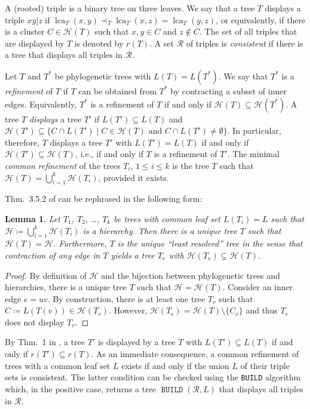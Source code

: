\documentclass[11pt]{article}
\newtheorem{lemma}[theorem]{Lemma}
\newcommand{\lca}{\operatorname{lca}}
\newcommand{\HH}{\mathcal{H}}
\DeclareMathOperator{\build}{\mathtt{BUILD}}
\begin{document}
A (rooted) triple is a binary tree on three leaves. We say that a tree $T$
displays a triple $xy|z$ if $\lca_T(x,y)\prec_T\lca_T(x,z)=\lca_T(y,z)$, or
equivalently, if there is a cluster $C\in \HH(T)$ such that $x,y \in C$ and
$z\notin C$. The set of all triples that are displayed by $T$ is denoted by
$r(T)$. A set $\mathcal{R}$ of triples is \emph{consistent} if there is a
tree that displays all triples in $\mathcal{R}$.

Let $T$ and $T^*$ be phylogenetic trees with $L(T)=L(T^*)$. We say that
$T^*$ is a \emph{refinement} of $T$ if $T$ can be obtained from $T^*$ by
contracting a subset of inner edges. Equivalently, $T^*$ is a refinement of
$T$ if and only if $\HH(T)\subseteq\HH(T^*)$. A tree $T$ \emph{displays} a
tree $T'$ if $L(T')\subseteq L(T)$ and
$\HH(T')\subseteq \{C\cap L(T') \mid C\in\HH(T) \text{ and } C\cap
L(T')\ne\emptyset\}$.  In particular, therefore, $T$ displays a tree $T'$
with $L(T')=L(T)$ if and only if $\HH(T')\subseteq\HH(T)$, i.e., if and
only if $T$ is a refinement of $T'$. The minimal \emph{common refinement}
of the trees $T_i$, $1\le i\le k$ is the tree $T$ such that
$\HH(T)=\bigcup_{i=1}^k \HH(T_i)$, provided it exists.

Thm.~3.5.2 of \cite{Semple:03} can be rephrased in the following form: 
\begin{lemma}
  \label{lem:leastresolved}
  Let $T_1$, $T_2$, \dots, $T_k$ be trees with common leaf set $L(T_i)=L$
  such that $\HH\coloneqq \bigcup_{i=1}^k\HH(T_i)$ is a hierarchy. Then
  there is a unique tree $T$ such that $\HH(T)=\HH$. Furthermore, $T$ is
  the unique ``least resolved'' tree in the sense that contraction of any
  edge in $T$ yields a tree $T_e$ with $\HH(T_e)\subsetneq \HH(T)$.
\end{lemma}
\begin{proof}
  By definition of $\HH$ and the bijection between phylogenetic trees
  and hierarchies, there is a unique tree $T$ such that
  $\HH=\HH(T)$. Consider an inner edge $e=uv$. By construction, there is
  at least one tree $T_v$ such that $C\coloneqq
  L(T(v))\in\HH(T_v)$. However, $\HH(T_e)=\HH(T)\setminus\{C_v\}$ and
  thus $T_e$ does not display $T_v$.
\end{proof}

By Thm.~1 in \cite{Bryant:95}, a tree $T'$ is displayed by a tree $T$ with
$L(T')\subseteq L(T)$ if and only if $r(T')\subseteq r(T)$.  As an
immediate consequence, a common refinement of trees with a common leaf set
$L$ exists if and only if the union $L$ of their triple sets is consistent.
The latter condition can be checked using the \texttt{BUILD} algorithm
which, in the positive case, returns a tree $\build(\mathcal{R},L)$ that
displays all triples in $\mathcal{R}$.
\end{document}
